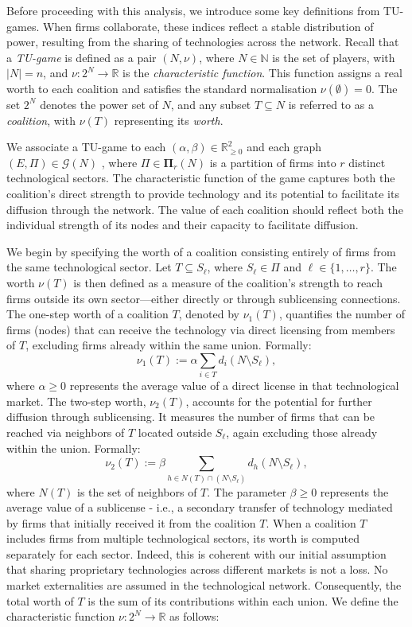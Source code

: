 \documentclass[preprint,11pt,authoryear]{elsarticle}
\theoremstyle{plain}
\begin{document}
Before proceeding with this analysis, we introduce some key definitions from TU-games. 
When firms collaborate, these indices reflect a stable distribution of power, resulting from the sharing of technologies across the network.
Recall that a \emph{TU-game} is defined as a pair \( (N, \nu) \), where \( N \in \mathbb{N} \) is the set of players, with \( |N| = n \), and \( \nu : 2^N \to \mathbb{R} \) is the \emph{characteristic function}. This function assigns a real worth to each coalition and satisfies the standard normalisation \( \nu(\emptyset) = 0 \). The set \( 2^N \) denotes the power set of \( N \), and any subset \( T \subseteq N \) is referred to as a \emph{coalition}, with \( \nu(T) \) representing its \emph{worth}.

We associate a TU-game to each $(\alpha,\beta)\in\mathbb{R}_{\geq0}^2$ and each graph 
 \( (E, \Pi) \in \mathcal{G}(N) \) , where \( \Pi \in \mathbf{\Pi}_r(N) \) is a partition of firms into \( r \) distinct technological sectors. The characteristic function of the game captures both the coalition's direct strength to provide technology and its potential to facilitate its diffusion through the network. 
The value of each coalition should reflect both the individual strength of its nodes and their capacity to facilitate diffusion.

 

We begin by specifying the worth of a coalition consisting entirely of firms from the same technological sector. Let \( T \subseteq S_\ell \), where \( S_\ell \in \Pi \) and \( \ell \in \{1, \dots, r\} \). The worth \( \nu(T) \) is then defined as a measure of the coalition’s strength to reach firms outside its own sector—either directly or through sublicensing connections.
The one-step worth of a coalition \(T\), denoted by \(\nu_1(T)\), quantifies the number of firms (nodes) that can receive the technology via direct licensing from members of \(T\), excluding firms already within the same union. Formally:
\[
\nu_1(T) := \alpha \sum_{i \in T} d_i(N\setminus S_\ell),
\]
where %
$\alpha\geq0$  represents the average value of a direct license in that technological market.
The two-step worth, \(\nu_2(T)\), accounts for the potential for further diffusion through sublicensing. It measures the number of firms that can be reached via neighbors of \(T\) located outside \(S_\ell\), again excluding those already within the union. Formally:
\[
\nu_2(T) := \beta \sum_{h \in N(T) \cap (N \setminus S_\ell)} d_h(N \setminus S_\ell),
\]
where \(N(T)\) is the set of neighbors of \(T\). The parameter %
$\beta\ge 0$  represents the average value of a sublicense - i.e., a secondary transfer of technology mediated by firms that initially received it from the coalition \(T\).
When a coalition \(T\) includes firms from multiple technological sectors, its worth is computed separately for each sector.
Indeed, this is coherent with our initial assumption that sharing proprietary technologies across different markets is not a loss. No market externalities are assumed in the technological network.
 Consequently, the total worth of 
\(T\) is the sum of its contributions within each union.
We define the characteristic function \(\nu: 2^N \to \mathbb{R}\) as follows:
\end{document}
